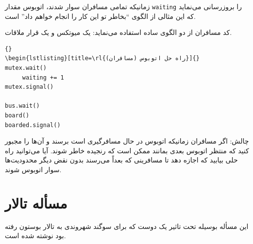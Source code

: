 \documentclass{book}
\newcommand{\clearemptydoublepage}{\newpage\cleardoublepage}
\begin{document}
    زمانیکه تمامی مسافران سوار شدند، اتوبوس مقدار  {\tt waiting} را بروزرسانی می‌نماید که این مثالی از الگوی ``بخاطر تو  این کار را انجام خواهم داد'' است. 

    کد مسافران از دو الگوی ساده استفاده می‌نماید: یک میوتکس و یک قرار ملاقات. 

\begin{latin}
\begin{lstlisting}[title={Bus problem solution (riders)}]{}
\begin{lstlisting}[title=\rl{راه حل اتوبوس (مسافران)}]{}
mutex.wait()
     waiting += 1
mutex.signal()

bus.wait()
board()
boarded.signal()
\end{lstlisting}
\end{latin}

    چالش: اگر مسافران زمانیکه اتوبوس در حال مسافرگیری است برسند و آن‌ها را مجبور کنید که منتظر اتوبوس بعدی بمانند ممکن است که رنجیده خاطر شوند. 
    آیا می‌توانید راه حلی بیابید که اجازه دهد تا مسافرینی که بعداً می‌رسند بدون نقض دیگر محدودیت‌ها سوار اتوبوس شوند. 
    


\clearemptydoublepage
\section{مسأله تالار }

    این مسأله بوسیله  تحت تاثیر یک دوست که  برای سوگند شهروندی به تالار   بوستون رفته بود نوشته شده است.
\end{document}
